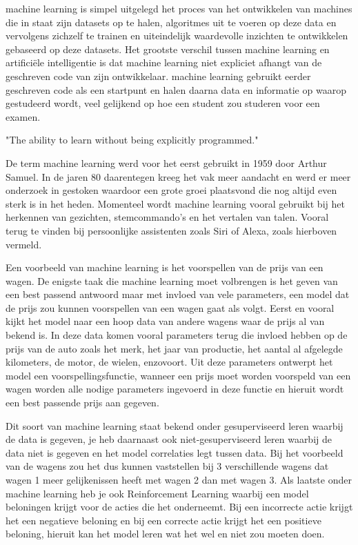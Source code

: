 machine learning is simpel uitgelegd het proces van het ontwikkelen van machines die in staat zijn datasets op te halen, algoritmes uit te voeren op deze data en vervolgens zichzelf te trainen en uiteindelijk waardevolle inzichten te ontwikkelen gebaseerd op deze datasets.
Het grootste verschil tussen machine learning en artificiële intelligentie is dat machine learning niet expliciet afhangt van de geschreven code van zijn ontwikkelaar. machine learning gebruikt eerder geschreven code als een startpunt en halen daarna data en informatie op waarop gestudeerd wordt, veel gelijkend op hoe een student zou studeren voor een examen.

\autocite{Arthur Samuel, 1959} "The ability to learn without being explicitly programmed."

De term machine learning werd voor het eerst gebruikt in 1959 door Arthur Samuel. In de jaren 80 daarentegen kreeg het vak meer aandacht en werd er meer onderzoek in gestoken waardoor een grote groei plaatsvond die nog altijd even sterk is in het heden. \autocite{KeithD.2019} 
Momenteel wordt machine learning vooral gebruikt bij het herkennen van gezichten, stemcommando's en het vertalen van talen. Vooral terug te vinden bij persoonlijke assistenten zoals Siri of Alexa, zoals hierboven vermeld.

Een voorbeeld van machine learning is het voorspellen van de prijs van een wagen.
De enigste taak die machine learning moet volbrengen is het geven van een best passend antwoord maar met invloed van vele parameters, een model dat de prijs zou kunnen voorspellen van een wagen gaat als volgt.
Eerst en vooral kijkt het model naar een hoop data van andere wagens waar de prijs al van bekend is. 
In deze data komen vooral parameters terug die invloed hebben op de prijs van de auto zoals het merk, het jaar van productie, het aantal al afgelegde kilometers, de motor, de wielen, enzovoort. 
Uit deze parameters ontwerpt het model een voorspellingsfunctie, wanneer een prijs moet worden voorspeld van een wagen worden alle nodige parameters ingevoerd in deze functie en hieruit wordt een best passende prijs aan gegeven.

Dit soort van machine learning staat bekend onder gesuperviseerd leren waarbij de data is gegeven, je heb daarnaast ook niet-gesuperviseerd leren waarbij de data niet is gegeven en het model correlaties legt tussen data.
Bij het voorbeeld van de wagens zou het dus kunnen vaststellen bij 3 verschillende wagens dat wagen 1 meer gelijkenissen heeft met wagen 2 dan met wagen 3.
Als laatste onder machine learning heb je ook Reinforcement Learning waarbij een model beloningen krijgt voor de acties die het onderneemt. Bij een incorrecte actie krijgt het een negatieve beloning en bij een correcte actie krijgt het een positieve beloning, hieruit kan het model leren wat het wel en niet zou moeten doen.

